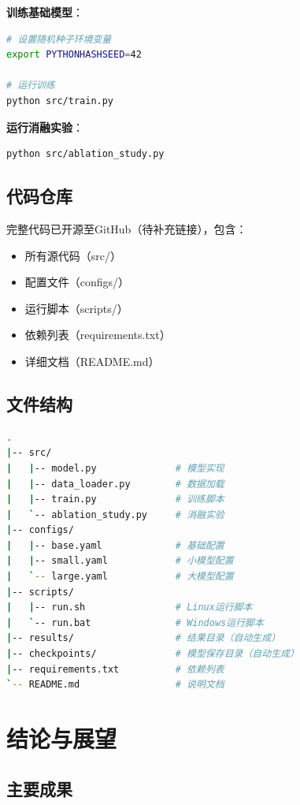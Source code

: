 \documentclass[UTF8,12pt,a4paper]{ctexart}
\begin{document}
\textbf{训练基础模型}：
\begin{lstlisting}[language=bash]
# 设置随机种子环境变量
export PYTHONHASHSEED=42

# 运行训练
python src/train.py
\end{lstlisting}

\textbf{运行消融实验}：
\begin{lstlisting}[language=bash]
python src/ablation_study.py
\end{lstlisting}

\subsection{代码仓库}

完整代码已开源至GitHub（待补充链接），包含：
\begin{itemize}
    \item 所有源代码（src/）
    \item 配置文件（configs/）
    \item 运行脚本（scripts/）
    \item 依赖列表（requirements.txt）
    \item 详细文档（README.md）
\end{itemize}

\subsection{文件结构}

\begin{lstlisting}[language=bash]
.
|-- src/
|   |-- model.py              # 模型实现
|   |-- data_loader.py        # 数据加载
|   |-- train.py              # 训练脚本
|   `-- ablation_study.py     # 消融实验
|-- configs/
|   |-- base.yaml             # 基础配置
|   |-- small.yaml            # 小模型配置
|   `-- large.yaml            # 大模型配置
|-- scripts/
|   |-- run.sh                # Linux运行脚本
|   `-- run.bat               # Windows运行脚本
|-- results/                  # 结果目录（自动生成）
|-- checkpoints/              # 模型保存目录（自动生成）
|-- requirements.txt          # 依赖列表
`-- README.md                 # 说明文档
\end{lstlisting}

\section{结论与展望}

\subsection{主要成果}
\end{document}
